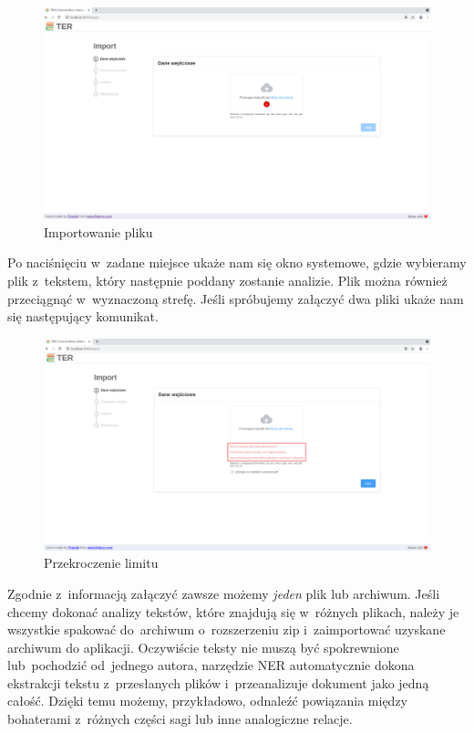 \documentclass[12pt, a4paper]{article}
\begin{document}
\begin{figure}[H]
  \centering
  \includegraphics[width=\linewidth]{images/import-before-file.png}
  \caption{Importowanie pliku}
\end{figure}

Po naciśnięciu w~zadane miejsce ukaże nam się okno systemowe, gdzie wybieramy plik z~tekstem, który następnie poddany zostanie analizie. Plik można również przeciągnąć w~wyznaczoną strefę. Jeśli spróbujemy załączyć dwa pliki ukaże nam się następujący komunikat.

\begin{figure}[H]
  \centering
  \includegraphics[width=\linewidth]{images/import-error.png}
  \caption{Przekroczenie limitu}
\end{figure}

Zgodnie z~informacją załączyć zawsze możemy \textit{jeden} plik lub archiwum. Jeśli chcemy dokonać analizy tekstów, które znajdują się w~różnych plikach, należy je wszystkie spakować do~archiwum o~rozszerzeniu zip i~zaimportować uzyskane archiwum do aplikacji. Oczywiście teksty nie muszą być spokrewnione lub~pochodzić od~jednego autora, narzędzie NER automatycznie dokona ekstrakcji tekstu z~przesłanych plików i~przeanalizuje dokument jako jedną całość. Dzięki temu możemy, przykładowo, odnaleźć powiązania między bohaterami z~różnych części sagi lub inne analogiczne relacje.
\end{document}
